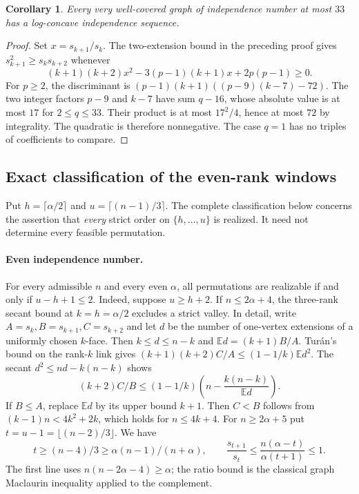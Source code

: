 \documentclass[11pt,a4paper]{article}
\newtheorem{corollary}[theorem]{Corollary}
\theoremstyle{remark}\newtheorem{remark}[theorem]{Remark}
\numberwithin{equation}{section}
\begin{document}
\begin{corollary}\label{cor:very33}
Every very well-covered graph of independence number at most $33$ has a
log-concave independence sequence.
\end{corollary}
\begin{proof}
Set $x=s_{k+1}/s_k$. The two-extension bound in the preceding proof gives
$s_{k+1}^2\ge s_k s_{k+2}$ whenever
\[
 (k+1)(k+2)x^2-3(p-1)(k+1)x+2p(p-1)\ge0.
\]
For $p\ge2$, the discriminant is
$(p-1)(k+1)((p-9)(k-7)-72)$.
The two integer factors $p-9$ and $k-7$ have sum $q-16$, whose absolute
value is at most $17$ for $2\le q\le33$. Their product is at most
$17^2/4$, hence at most $72$ by integrality. The quadratic is therefore
nonnegative. The case $q=1$ has no triples of coefficients to compare.
\end{proof}

\subsection{Exact classification of the even-rank windows}

Put $h=\lceil\alpha/2\rceil$ and $u=\lceil(n-1)/3\rceil$. The complete
classification below concerns the assertion that \emph{every} strict order on
$\{h,\ldots,u\}$ is realized. It need not determine every feasible permutation.

\paragraph{Even independence number.}
For every admissible $n$ and every even $\alpha$, all permutations are
realizable if and only if $u-h+1\le2$.
Indeed, suppose $u\ge h+2$. If $n\le2\alpha+4$, the three-rank
secant bound at $k=h=\alpha/2$ excludes a strict valley. In detail,
write $A=s_k,B=s_{k+1},C=s_{k+2}$ and let $d$ be the number of
one-vertex extensions of a uniformly chosen $k$-face. Then
$k\le d\le n-k$ and $\mathbb E d=(k+1)B/A$.
Tur\'an's bound on the rank-$k$ link gives
$(k+1)(k+2)C/A\le (1-1/k)\mathbb E d^2$. The secant
$d^2\le nd-k(n-k)$ shows
\[
 (k+2)C/B\le (1-1/k)\left(n-\frac{k(n-k)}{\mathbb E d}\right).
\]
If $B\le A$, replace $\mathbb E d$ by its upper bound $k+1$.
Then $C<B$ follows from $(k-1)n<4k^2+2k$, which holds for
$n\le4k+4$. For $n\ge2\alpha+5$ put $t=u-1=\lfloor(n-2)/3\rfloor$.
We have
\[
t\ge(n-4)/3\ge\alpha(n-1)/(n+\alpha),
\qquad
\frac{s_{t+1}}{s_t}\le\frac{n(\alpha-t)}{\alpha(t+1)}\le1.
\]
The first line uses $n(n-2\alpha-4)\ge\alpha$; the ratio bound is the
classical graph Maclaurin inequality applied to the complement.
\end{document}
